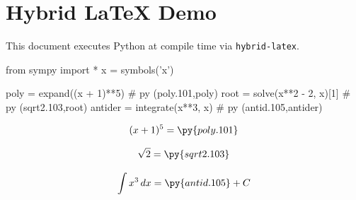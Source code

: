 \documentclass[12pt]{pylatex}
\begin{document}
\section*{Hybrid \LaTeX{} Demo}

This document executes Python at compile time via \texttt{hybrid-latex}.

\begin{python}
   from sympy import *
   x = symbols('x')

   poly    = expand((x + 1)**5)       # py (poly.101,poly)
   root    = solve(x**2 - 2, x)[1]   # py (sqrt2.103,root)
   antider = integrate(x**3, x)      # py (antid.105,antider)
\end{python}

\[
  (x+1)^5 = \py{poly.101}
\]

\[
  \sqrt{2} = \py{sqrt2.103}
\]

\[
  \int x^3\,dx = \py{antid.105} + C
\]
\end{document}

